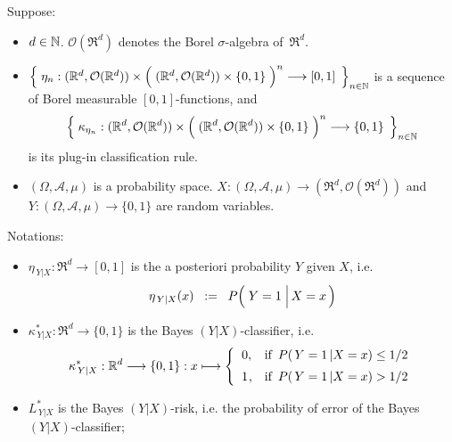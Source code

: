 \vskip 0.5cm
\begin{theorem}
\mbox{}\vskip 0.1cm
\noindent
Suppose:
\begin{itemize}
\item
	$d \in \mathbb{N}$.
	$\mathcal{O}(\Re^{d})$ denotes the Borel $\sigma$-algebra of \,$\Re^{d}$.
\item
	$\left\{\;
	\eta_{n} :
	(\Re^{d},\mathcal{O}(\Re^{d})) \times \left(\;(\Re^{d},\mathcal{O}(\Re^{d})) \overset{{\color{white}.}}{\times} \{0,1\} \;\right)^{n}
	\longrightarrow
	[0,1]
	\,\;\right\}_{n \in \N}$\;
	is a sequence of Borel measurable $[0,1]$-functions, and
	\begin{equation*}
	\left\{\;
	\kappa_{\eta_{n}} : 
	(\Re^{d},\mathcal{O}(\Re^{d})) \times \left(\;(\Re^{d},\mathcal{O}(\Re^{d})) \overset{{\color{white}.}}{\times} \{0,1\} \;\right)^{n}
	\longrightarrow
	\{0,1\}
	\,\;\right\}_{n\in\N}
	\end{equation*}
	is its plug-in classification rule.
\item
	$(\Omega,\mathcal{A},\mu)$ is a probability space.
	$X : (\Omega,\mathcal{A},\mu) \longrightarrow (\Re^{d},\mathcal{O}(\Re^{d}))$ and\,
	$Y : (\Omega,\mathcal{A},\mu) \longrightarrow \{0,1\}$
	are random variables.
\end{itemize}
Notations:
\begin{itemize}
\item
	$\eta_{\,Y \vert X } : \Re^{d} \longrightarrow [0,1]$ is the a posteriori probability $Y$ given $X$, i.e.
	\begin{equation*}
	\eta_{\,Y \vert X}(x) \;\; := \;\; P\!\left(\,\left. \overset{{\color{white}.}}{Y} = 1 \;\right\vert X = x \,\right)
	\end{equation*}
\item
	$\kappa^{*}_{\,Y \vert X} : \Re^{d} \longrightarrow \{0,1\}$ is the Bayes $(Y \vert X)$-classifier, i.e.
	\begin{equation*}
	\kappa^{*}_{\,Y \vert X} : \Re^{d} \longrightarrow \{0,1\} : x \longmapsto
		\left\{\begin{array}{cl}
			0, & \textnormal{if \,$P(\,Y=1 \,\vert X = x) \leq 1/2$}
			\\
			\overset{{\color{white}-}}{1}, & \textnormal{if \,$P(\,Y=1 \,\vert X = x) > 1/2$}
		\end{array}\right.
	\end{equation*}
\item
	$L^{*}_{\,Y \vert X}$ is the Bayes $(Y \vert X)$-risk,
	i.e. the probability of error of the Bayes $(Y \vert X)$-classifier;

\end{itemize}
\end{theorem}
